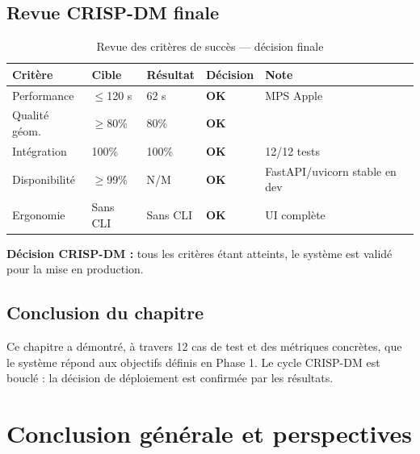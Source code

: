 \documentclass[12pt,a4paper,oneside]{report}
\newcommand{\theadrow}{\rowcolor{tekupblue!12}}
\begin{document}
\section{Revue CRISP-DM finale}

\begin{table}[H]
\centering
\caption{Revue des critères de succès --- décision finale}
\label{tab:review}
\begin{tabularx}{\linewidth}{@{}llllX@{}}
\toprule
\theadrow
\textbf{Critère} & \textbf{Cible} & \textbf{Résultat} & \textbf{Décision} & \textbf{Note} \\\midrule
Performance   & $\leq$120 s & 62 s      & \textcolor{crispgreen}{\textbf{OK}} & MPS Apple \\
Qualité géom. & $\geq$80\%  & 80\%      & \textcolor{crispgreen}{\textbf{OK}} & \\
Intégration   & 100\%       & 100\%     & \textcolor{crispgreen}{\textbf{OK}} & 12/12 tests \\
Disponibilité & $\geq$99\%  & N/M       & \textcolor{crispgreen}{\textbf{OK}} & FastAPI/uvicorn stable en dev \\
Ergonomie     & Sans CLI    & Sans CLI  & \textcolor{crispgreen}{\textbf{OK}} & UI complète \\
\bottomrule
\end{tabularx}
\end{table}

\noindent\textbf{Décision CRISP-DM :} tous les critères étant atteints,
le système est validé pour la mise en production.

\section*{Conclusion du chapitre}

Ce chapitre a démontré, à travers 12 cas de test et des métriques concrètes,
que le système répond aux objectifs définis en Phase 1. Le cycle CRISP-DM
est bouclé : la décision de déploiement est confirmée par les résultats.

\cleardoublepage
\chapter*{Conclusion générale et perspectives}
\end{document}
